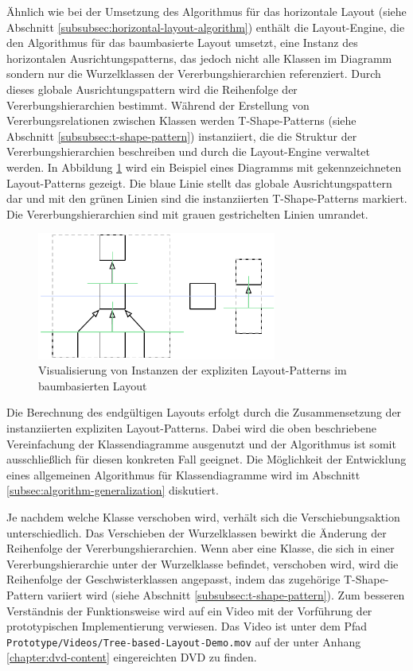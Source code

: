 Ähnlich wie bei der Umsetzung des Algorithmus für das horizontale Layout (siehe Abschnitt \ref{subsubsec:horizontal-layout-algorithm}) enthält die Layout-Engine, die den Algorithmus für das baumbasierte Layout umsetzt, eine Instanz des horizontalen Ausrichtungspatterns, das jedoch nicht alle Klassen im Diagramm sondern nur die Wurzelklassen der Vererbungshierarchien referenziert. Durch dieses globale Ausrichtungspattern wird die Reihenfolge der Vererbungshierarchien bestimmt. Während der Erstellung von Vererbungsrelationen zwischen Klassen werden T-Shape-Patterns (siehe Abschnitt \ref{subsubsec:t-shape-pattern}) instanziiert, die die Struktur der Vererbungshierarchien beschreiben und durch die Layout-Engine verwaltet werden. In Abbildung \ref{fig:tree-based-layout} wird ein Beispiel eines Diagramms mit gekennzeichneten Layout-Patterns gezeigt. Die blaue Linie stellt das globale Ausrichtungspattern dar und mit den grünen Linien sind die instanziierten T-Shape-Patterns markiert. Die Vererbungshierarchien sind mit grauen gestrichelten Linien umrandet.

\begin{figure}[hbt]
    \centering
    \includegraphics[width=0.7\textwidth]{resources/tree-based-layout}
    \caption{Visualisierung von Instanzen der expliziten Layout-Patterns im baumbasierten Layout}
    \label{fig:tree-based-layout}
\end{figure}

Die Berechnung des endgültigen Layouts erfolgt durch die Zusammensetzung der instanziierten expliziten Layout-Patterns. Dabei wird die oben beschriebene Vereinfachung der Klassendiagramme ausgenutzt und der Algorithmus ist somit ausschließlich für diesen konkreten Fall geeignet. Die Möglichkeit der Entwicklung eines allgemeinen Algorithmus für Klassendiagramme wird im Abschnitt \ref{subsec:algorithm-generalization} diskutiert.

Je nachdem welche Klasse verschoben wird, verhält sich die Verschiebungsaktion unterschiedlich. Das Verschieben der Wurzelklassen bewirkt die Änderung der Reihenfolge der Vererbungshierarchien. Wenn aber eine Klasse, die sich in einer Vererbungshierarchie unter der Wurzelklasse befindet, verschoben wird, wird die Reihenfolge der Geschwisterklassen angepasst, indem das zugehörige T-Shape-Pattern variiert wird (siehe Abschnitt \ref{subsubsec:t-shape-pattern}). Zum besseren Verständnis der Funktionsweise wird auf ein Video mit der Vorführung der prototypischen Implementierung verwiesen. Das Video ist unter dem Pfad \texttt{Prototype/Videos/Tree-based-Layout-\-De\-mo.mov} auf der unter Anhang \ref{chapter:dvd-content} eingereichten DVD zu finden.

